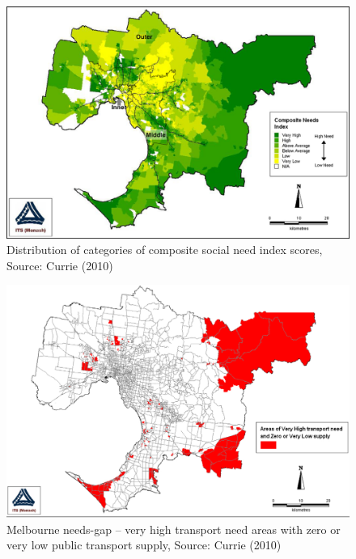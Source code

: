 \documentclass[preprint, 3p,
authoryear]{elsarticle} %
\begin{document}
\begin{figure}
\includegraphics[width=1\linewidth]{graphics/Currie2010Needs} \caption{Distribution of categories of composite social need index scores, Source: Currie (2010)}\label{fig:Currie_map_needs}
\end{figure}

\begin{figure}
\includegraphics[width=1\linewidth]{graphics/Currie2010gap} \caption{Melbourne needs-gap – very high transport need areas with zero or very low public transport supply, Source: Currie (2010)}\label{fig:Currie_map_gap}
\end{figure}
\end{document}
